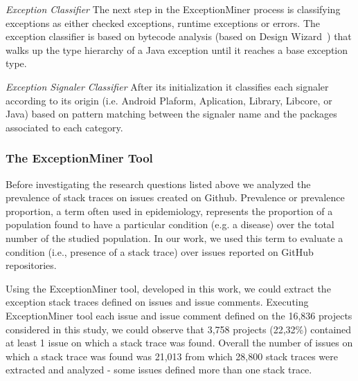 \documentclass[conference]{IEEEtran}
\begin{document}


\noindent\emph{Exception Classifier} The next step in the ExceptionMiner process
is classifying exceptions as either checked exceptions, runtime exceptions or 
errors. The exception classifier is based on bytecode analysis (based on Design
Wizard~\cite{Brunet09}) that walks up the type hierarchy of a Java exception
until it reaches a base exception type.

\noindent\emph{Exception Signaler Classifier} After its initialization it
classifies each signaler according to its origin (i.e. Android Plaform,
Aplication, Library, Libcore, or Java) based on pattern matching between the
signaler name and the packages associated to each category.


\subsubsection{The ExceptionMiner Tool}

Before investigating the research questions listed above we analyzed the prevalence of stack traces 
on issues created on Github. Prevalence or prevalence proportion, a term often used in epidemiology,
represents the proportion of a population found to have a particular condition
(e.g. a disease) over the total number of the studied population. In our work, we used
this term to evaluate a condition (i.e., presence of a stack trace) over issues
reported on GitHub repositories.

Using the ExceptionMiner tool, developed in this work, we could extract the exception stack traces defined on issues and issue comments. Executing ExceptionMiner tool each issue and issue comment defined on the 16,836 projects considered in this study, we could observe that 3,758 projects (22,32\%) contained at least 1 issue on which a stack trace was found. Overall the number of issues on which a stack trace was found was 21,013 from which 28,800 stack traces were extracted and analyzed - some issues defined more than one stack trace.
\end{document}

